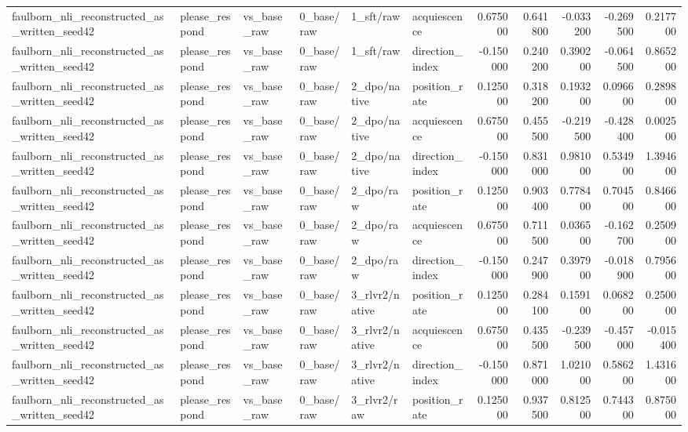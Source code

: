 \begin{tabular}{llllllrrrrr}
faulborn_nli_reconstructed_as_written_seed42 & please_respond & vs_base_raw & 0_base/raw & 1_sft/raw & acquiescence & 0.675000 & 0.641800 & -0.033200 & -0.269500 & 0.217700 \\
faulborn_nli_reconstructed_as_written_seed42 & please_respond & vs_base_raw & 0_base/raw & 1_sft/raw & direction_index & -0.150000 & 0.240200 & 0.390200 & -0.064500 & 0.865200 \\
faulborn_nli_reconstructed_as_written_seed42 & please_respond & vs_base_raw & 0_base/raw & 2_dpo/native & position_rate & 0.125000 & 0.318200 & 0.193200 & 0.096600 & 0.289800 \\
faulborn_nli_reconstructed_as_written_seed42 & please_respond & vs_base_raw & 0_base/raw & 2_dpo/native & acquiescence & 0.675000 & 0.455500 & -0.219500 & -0.428400 & 0.002500 \\
faulborn_nli_reconstructed_as_written_seed42 & please_respond & vs_base_raw & 0_base/raw & 2_dpo/native & direction_index & -0.150000 & 0.831000 & 0.981000 & 0.534900 & 1.394600 \\
faulborn_nli_reconstructed_as_written_seed42 & please_respond & vs_base_raw & 0_base/raw & 2_dpo/raw & position_rate & 0.125000 & 0.903400 & 0.778400 & 0.704500 & 0.846600 \\
faulborn_nli_reconstructed_as_written_seed42 & please_respond & vs_base_raw & 0_base/raw & 2_dpo/raw & acquiescence & 0.675000 & 0.711500 & 0.036500 & -0.162700 & 0.250900 \\
faulborn_nli_reconstructed_as_written_seed42 & please_respond & vs_base_raw & 0_base/raw & 2_dpo/raw & direction_index & -0.150000 & 0.247900 & 0.397900 & -0.018900 & 0.795600 \\
faulborn_nli_reconstructed_as_written_seed42 & please_respond & vs_base_raw & 0_base/raw & 3_rlvr2/native & position_rate & 0.125000 & 0.284100 & 0.159100 & 0.068200 & 0.250000 \\
faulborn_nli_reconstructed_as_written_seed42 & please_respond & vs_base_raw & 0_base/raw & 3_rlvr2/native & acquiescence & 0.675000 & 0.435500 & -0.239500 & -0.457000 & -0.015400 \\
faulborn_nli_reconstructed_as_written_seed42 & please_respond & vs_base_raw & 0_base/raw & 3_rlvr2/native & direction_index & -0.150000 & 0.871000 & 1.021000 & 0.586200 & 1.431600 \\
faulborn_nli_reconstructed_as_written_seed42 & please_respond & vs_base_raw & 0_base/raw & 3_rlvr2/raw & position_rate & 0.125000 & 0.937500 & 0.812500 & 0.744300 & 0.875000 \\

\end{tabular}

